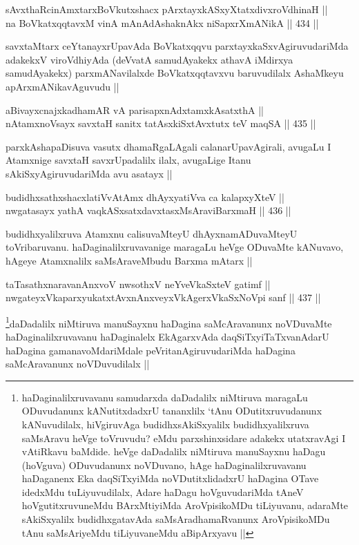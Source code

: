 \begin{shl}
sAvxthaRcinAmxtarxBoVkutxshacx pArxtayxkASxyXtatxdivxroVdhinaH ||  \\
na BoVkatxqqtavxM vinA mAnAdAshaknAkx niSapxrXmANikA ||  434 ||  
\end{shl}

\begin{artha}
savxtaMtarx ceYtanayxrUpavAda BoVkatxqqvu parxtayxkaSxvAgiruvudariMda adakekxV viroVdhiyAda (deVvatA samudAyakekx athavA iMdirxya samudAyakekx) parxmANavilalxde BoVkatxqqtavxvu baruvudilalx AshaMkeyu apArxmANikavAguvudu ||
\end{artha}

\begin{shl}
aBivayxcnajxkadhamAR vA parisapxnAdxtamxkAsatxthA ||  \\
nA\s \s tamxnoV\s sayx savxtaH sanitx tatAsxkiSxtAvxtutx teV maqSA ||  435 ||  
\end{shl}

\begin{artha}
parxkAshapaDisuva vasutx dhamaRgaLAgali calanarUpavAgirali, avugaLu I Atamxnige savxtaH savxrUpadalilx ilalx, avugaLige Itanu sAkiSxyAgiruvudariMda avu asatayx ||
\end{artha}

\begin{shl}
budidhxsathxshacxlatiVvA\s \s tAmx dhAyxyatiVva ca kalapxyXteV || \\
nwgatasayx yathA vaqkASxsatxdavxtasxMsAraviBarxmaH ||  436 ||  
\end{shl}

\begin{artha}
budidhxyalilxruva Atamxnu calisuvaMteyU dhAyxnamADuvaMteyU toVribaruvanu. haDaginalilxruvavanige maragaLu heVge ODuvaMte kANuvavo, hAgeye Atamxnalilx saMsAraveMbudu Barxma mAtarx ||
\end{artha}

\begin{shl}
taTasathxnaravanAnxvoV nwsothxV neYveVkaSxteV gatimf ||  \\
nwgateyxVkaparxyukatxtAvxnAnxveyxVkAgerxVkaSxNoV\s pi sanf ||  437 ||  
\end{shl}

\begin{artha}
\footnote{haDaginalilxruvavanu samudarxda daDadalilx niMtiruva maragaLu ODuvudanunx kANutitxdadxrU tananxlilx `tAnu ODutitxruvudanunx kANuvudilalx, hiVgiruvAga budidhxsAkiSxyalilx budidhxyalilxruva saMsAravu heVge toVruvudu? eMdu parxshinxsidare adakekx utatxravAgi I vAtiRkavu baMdide. heVge daDadalilx niMtiruva manuSayxnu haDagu (hoVguva) ODuvudanunx noVDuvano, hAge haDaginalilxruvavanu haDaganenx Eka daqSiTxyiMda noVDutitxlidadxrU haDagina OTave idedxMdu tuLiyuvudilalx, Adare haDagu hoVguvudariMda tAneV hoVgutitxruvuneMdu BArxMtiyiMda AroVpisikoMDu tiLiyuvanu, adaraMte sAkiSxyalilx budidhxgatavAda saMsAradhamaRvanunx AroVpisikoMDu tAnu saMsAriyeMdu tiLiyuvaneMdu aBipArxyavu ||}daDadalilx niMtiruva manuSayxnu haDagina saMcAravanunx noVDuvaMte haDaginalilxruvavanu haDaginalelx EkAgarxvAda daqSiTxyiTaTxvanAdarU haDagina gamanavoMdariMdale peVritanAgiruvudariMda haDagina saMcAravanunx noVDuvudilalx ||
\end{artha}


